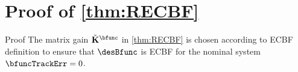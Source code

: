 \section{Proof of \cref{thm:RECBF}}\label{proof:RECBF}
\begin{custumProof}{Proof}
	The matrix gain $\check{\mathbf{K}}^{\bfunc}$ in \cref{thm:RECBF} is chosen according to ECBF definition to ensure that $\desBfunc$ is ECBF for the nominal system $\bfuncTrackErr=0$. %
	

\end{custumProof}
